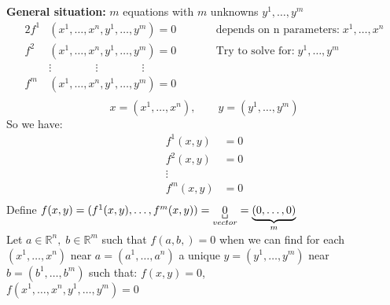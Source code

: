 \documentclass[12pt]{article}
\def\RR{\mathbb{R}}
\begin{document}
\textbf{General situation:} $m$ equations with $ m$ unknowns $y^1, \dots , y^m$
\begin{alignat*}{2}
f^1 &(x^1 , \dots , x^n , y^1 , \dots , y^m) = 0 &\qquad & \text{depends on n parameters:}\; x^1 , \dots , x^n\\
f^2 &(x^1 , \dots , x^n , y^1 , \dots , y^m)= 0 &\qquad & \text{Try to solve for:} \;  y^1 , \dots , y^m\\
&\vdots \qquad \qquad \vdots \qquad \qquad \vdots 			&\quad & \\
f^m &(x^1 , \dots , x^n , y^1 , \dots , y^m)= 0 &\quad &\\
\end{alignat*}
\[ x=(x^1 , \dots , x^n) , \qquad y=(y^1 , \dots , y^m)\]
So we have:
\begin{align*}
f^1(x,y) &=0\\
f^2(x,y) &=0\\
\vdots\\
f^m(x,y) &=0\\
\end{align*}
Define $f(x,y) = (f^1(x,y), \dots , f^m (x,y))=\underbracket[0.5pt]{0}_{vector} =\underbrace{(0,\dots,0)}_{
          \mathclap{m}}$\\
Let $a \in \RR^n , \; b \in \RR^m$ such that $f(a,b,) = 0$ when we can find for each $(x^1,  \dots, x^n) $  near $a=(a^1 , \dots , a^n )$ a unique $y=(y^1 , \dots , y^m )$ near $b= (b^1 , \dots , b^m)$ such that: $f(x,y)=0$, \\$f(x^1 , \dots , x^n , y^1 , \dots , y^m) = 0$
\end{document}

